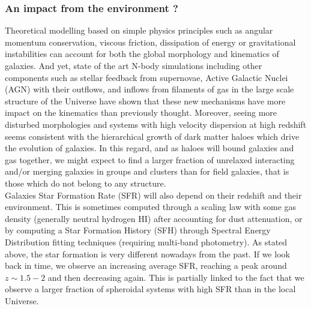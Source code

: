 \newpage
\subsubsection{An impact from the environment ?}

Theoretical modelling based on simple physics principles such as angular momentum conservation, viscous friction, dissipation of energy or gravitational instabilities can account for both the global morphology and kinematics of galaxies. And yet, state of the art N-body simulations including other components such as stellar feedback from supernovae, Active Galactic Nuclei (AGN) with their outflows, and inflows from filaments of gas in the large scale structure of the Universe have shown that these new mechanisms have more impact on the kinematics than previously thought. Moreover, seeing more disturbed morphologies and systems with high velocity dispersion at high redshift seems consistent with the hierarchical growth of dark matter haloes which drive the evolution of galaxies. In this regard, and as haloes will bound galaxies and gas together, we might expect to find a larger fraction of unrelaxed interacting and/or merging galaxies in groups and clusters than for field galaxies, that is those which do not belong to any structure. \\


Galaxies Star Formation Rate (SFR) will also depend on their redshift and their environment. This is sometimes computed through a scaling law with some gas density (generally neutral hydrogen HI) after accounting for dust attenuation, or by computing a Star Formation History (SFH) through Spectral Energy Distribution fitting techniques (requiring multi-band photometry). As stated above, the star formation is very different nowadays from the past. If we look back in time, we observe an increasing average SFR, reaching a peak around $z \sim 1.5 - 2$ and then decreasing again. This is partially linked to the fact that we observe a larger fraction of spheroidal systems with high SFR than in the local Universe. \\

